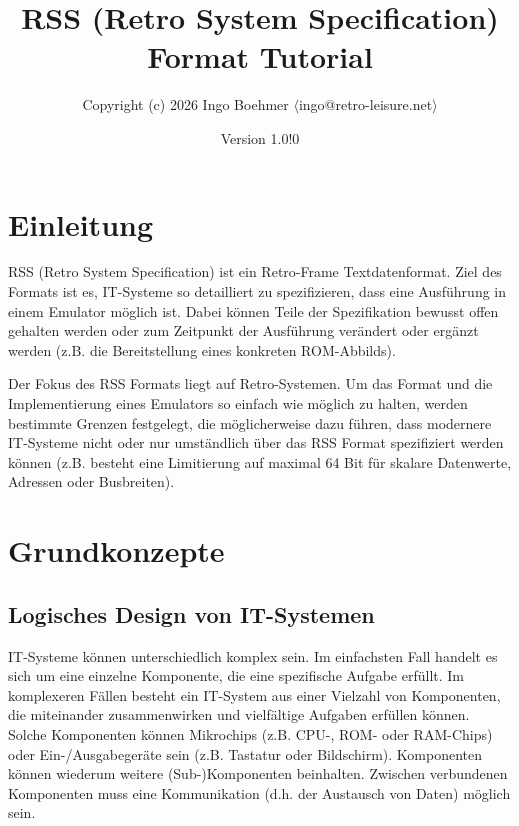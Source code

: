\documentclass{scrartcl}
\title{RSS (Retro System Specification) Format Tutorial}
\author{Copyright (c) 2026 Ingo Boehmer $\langle$ingo@retro-leisure.net$\rangle$ }
\date{Version 1.0!0}
\begin{document}
\begin{titlepage}
\maketitle
\vspace{40pt}
\tableofcontents
\end{titlepage}

\newpage

\section{Einleitung}

\noindent RSS (Retro System Specification) ist ein Retro-Frame Textdatenformat. Ziel des Formats ist es, IT-Systeme so detailliert zu spezifizieren, dass eine Ausführung in einem Emulator möglich ist. Dabei können Teile der Spezifikation bewusst offen gehalten werden oder zum Zeitpunkt der Ausführung verändert oder ergänzt werden (z.B. die Bereitstellung eines konkreten ROM-Abbilds).

\vspace{10pt}
\noindent Der Fokus des RSS Formats liegt auf Retro-Systemen. Um das Format und die Implementierung eines Emulators so einfach wie möglich zu halten, werden bestimmte Grenzen festgelegt, die möglicherweise dazu führen, dass modernere IT-Systeme nicht oder nur umständlich über das RSS Format spezifiziert werden können (z.B. besteht eine Limitierung auf maximal 64 Bit für skalare Datenwerte, Adressen oder Busbreiten).

\section{Grundkonzepte}

\subsection{Logisches Design von IT-Systemen}

\noindent IT-Systeme können unterschiedlich komplex sein. Im einfachsten Fall handelt es sich um eine einzelne Komponente, die eine spezifische Aufgabe erfüllt. Im komplexeren Fällen besteht ein IT-System aus einer Vielzahl von Komponenten, die miteinander zusammenwirken und vielfältige Aufgaben erfüllen können. Solche Komponenten können Mikrochips (z.B. CPU-, ROM- oder RAM-Chips) oder Ein-/Ausgabegeräte sein (z.B. Tastatur oder Bildschirm). Komponenten können wiederum weitere (Sub-)Komponenten beinhalten. Zwischen verbundenen Komponenten muss eine Kommunikation (d.h. der Austausch von Daten) möglich sein.
\end{document}
